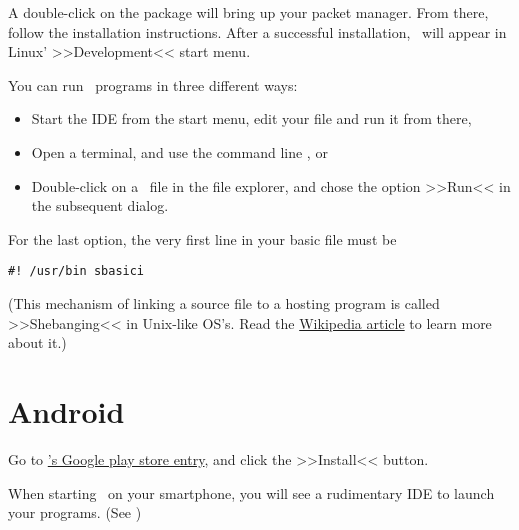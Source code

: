 A double-click on the package will bring up your packet manager. From
there, follow the installation instructions. After a successful
installation, \SB\ will appear in Linux' >>Development<< start menu.

You can run \SB\ programs in three different ways:

\begin{itemize}

\item Start the IDE from the start menu, edit your file and run it from
there,

\item Open a terminal, and use the command line , or

\item Double-click on a \SB\ file in the file explorer, and chose the
option >>Run<< in the subsequent dialog.

\end{itemize}

For the last option, the very first line in your basic file must be

\begin{lstlisting}
#! /usr/bin sbasici
\end{lstlisting}

(This mechanism of linking a source file to a hosting program is called
>>Shebanging<< in Unix-like OS's. Read the
\href{http://en.wikipedia.org/wiki/Shebang_(Unix)}{Wikipedia
article} to learn more about it.) 

\section{Android}

Go to 
\href{https://play.google.com/store/apps/details?id=net.sourceforge.smallbasic}{\SB's
Google play store entry}, and click the >>Install<< button.

When starting \SB\ on your smartphone, you will see a rudimentary IDE
to launch your programs. (See )
